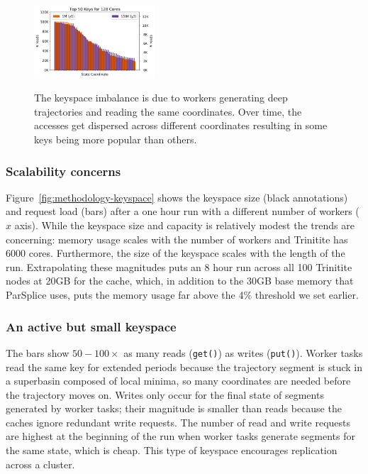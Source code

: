 \begin{figure}[t]
  \noindent\includegraphics[width=0.4\textwidth]{figures/methodology-keys.png}\\
  \caption{The keyspace imbalance is due to workers generating deep
  trajectories and reading the same coordinates. Over time, the accesses get
  dispersed across different coordinates resulting in some keys being more
  popular than others.\label{fig:methodology-keys}}
\end{figure}

\subsubsection*{Scalability concerns} 
Figure~\ref{fig:methodology-keyspace} shows the keyspace size (black
annotations) and request load (bars) after a one hour run with a different
number of workers (\(x\) axis). While the keyspace size and capacity is
relatively modest the trends are concerning: memory usage scales with the
number of workers and Trinitite has 6000 cores. Furthermore, the size of the
keyspace scales with the length of the run. Extrapolating these magnitudes puts
an 8 hour run across all 100 Trinitite nodes at 20GB for the cache, which, in
addition to the 30GB base memory that ParSplice uses, puts the memory usage far
above the 4\% threshold we set earlier.

\subsubsection*{An active but small keyspace} 
The bars show \(50-100\times\) as many reads (\texttt{get()}) as writes
(\texttt{put()}).  Worker tasks read the same key for extended periods because
the trajectory segment is stuck in a superbasin composed of local minima, so
many coordinates are needed before the trajectory moves on. Writes only occur
for the final state of segments generated by worker tasks; their magnitude is
smaller than reads because the caches ignore redundant write requests. The
number of read and write requests are highest at the beginning of the run when
worker tasks generate segments for the same state, which is cheap. This type of
keyspace encourages replication across a cluster.  

